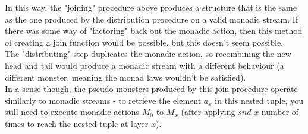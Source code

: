 \documentclass{article}
\begin{document}
In this way, the "joining" procedure above produces a structure that is the same as the one produced by the distribution procedure on a valid monadic stream. If there was some way of "factoring" back out the monadic action, then this method of creating a join function would be possible, but this doesn't seem possible.\\ 

The "distributing" step duplicates the monadic action, so recombining the new head and tail would produce a monadic stream with a different behaviour (a different monster, meaning the monad laws wouldn't be satisfied).\\

In a sense though, the pseudo-monsters produced by this join procedure operate similarly to monadic streams - to retrieve the element $a_x$ in this nested tuple, you still need to execute monadic actions $M_0$ to $M_x$ (after applying $snd$ $x$ number of times to reach the nested tuple at layer $x$).
\end{document}
